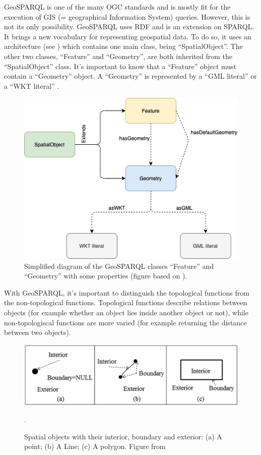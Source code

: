 \documentclass[twocolumn]{phdsymp} %
\begin{document}
GeoSPARQL is one of the many OGC standards and is mostly fit for the execution of GIS (= geographical Information System) queries. However, this is not its only possibility. GeoSPARQL uses RDF and is an extension on SPARQL. It brings a new vocabulary for representing geospatial data. To do so, it uses an architecture (see ) which contains one main class, being ``SpatialObject''. The other two classes, ``Feature'' and ``Geometry'', are both inherited from the ``SpatialObject'' class.  It's important to know that a ``Feature'' object must contain a ``Geometry'' object. A ``Geometry'' is represented by a ``GML literal'' or a ``WKT literal'' \cite{ogcdocs}.

\begin{figure}[ht]
    \centering
    \includegraphics[width=\linewidth]{images/geosparql_architecture.png}
    \caption{Simplified diagram of the GeoSPARQL classes ``Feature'' and ``Geometry'' with some properties (figure based on \protect\cite{geosparqlsupport}).}
    \label{fig:abstr_geosparql_architecture}
\end{figure}

With GeoSPARQL, it's important to distinguish the topological functions from the non-topological functions. Topological functions describe relations between objects (for example whether an object lies inside another object or not), while non-topologiscal functions are more varied (for example returning the distance between two objects).

\begin{figure}[ht]
    \centering
    \includegraphics[width=\linewidth]{images/spatial_objects_DE-9IM.png}
    \caption{Spatial objects with their interior, boundary and exterior: (a) A point; (b) A Line; (c) A polygon. Figure from \protect\cite{shen2018classification}}.
    \label{fig:abstr_de-9im}
\end{figure}
\end{document}
